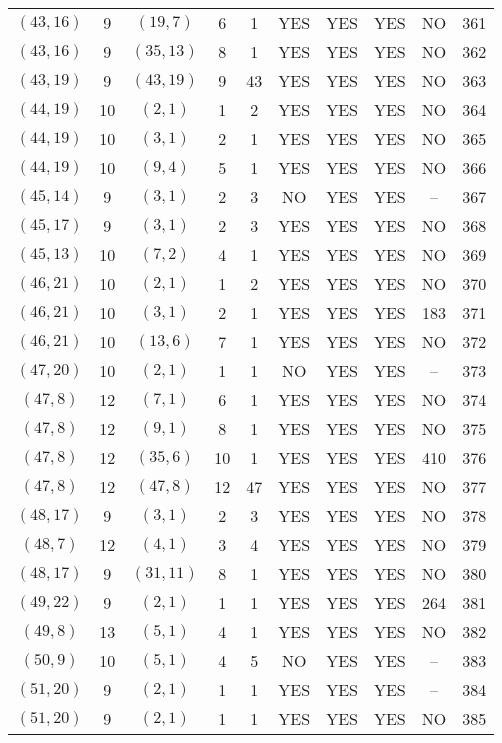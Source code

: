\begin{longtable}{|c|c|c|c|c|c|c|c|c|c|}
$(43, 16)$ & 9 & $(19, 7)$ & 6 & 1 & YES & YES & YES & NO & 361\\
$(43, 16)$ & 9 & $(35, 13)$ & 8 & 1 & YES & YES & YES & NO & 362\\
$(43, 19)$ & 9 & $(43, 19)$ & 9 & 43 & YES & YES & YES & NO & 363\\
$(44, 19)$ & 10 & $(2, 1)$ & 1 & 2 & YES & YES & YES & NO & 364\\
$(44, 19)$ & 10 & $(3, 1)$ & 2 & 1 & YES & YES & YES & NO & 365\\
$(44, 19)$ & 10 & $(9, 4)$ & 5 & 1 & YES & YES & YES & NO & 366\\
$(45, 14)$ & 9 & $(3, 1)$ & 2 & 3 & NO & YES & YES & -- & 367\\
$(45, 17)$ & 9 & $(3, 1)$ & 2 & 3 & YES & YES & YES & NO & 368\\
$(45, 13)$ & 10 & $(7, 2)$ & 4 & 1 & YES & YES & YES & NO & 369\\
$(46, 21)$ & 10 & $(2, 1)$ & 1 & 2 & YES & YES & YES & NO & 370\\
$(46, 21)$ & 10 & $(3, 1)$ & 2 & 1 & YES & YES & YES & 183 & 371\\
$(46, 21)$ & 10 & $(13, 6)$ & 7 & 1 & YES & YES & YES & NO & 372\\
$(47, 20)$ & 10 & $(2, 1)$ & 1 & 1 & NO & YES & YES & -- & 373\\
$(47, 8)$ & 12 & $(7, 1)$ & 6 & 1 & YES & YES & YES & NO & 374\\
$(47, 8)$ & 12 & $(9, 1)$ & 8 & 1 & YES & YES & YES & NO & 375\\
$(47, 8)$ & 12 & $(35, 6)$ & 10 & 1 & YES & YES & YES & 410 & 376\\
$(47, 8)$ & 12 & $(47, 8)$ & 12 & 47 & YES & YES & YES & NO & 377\\
$(48, 17)$ & 9 & $(3, 1)$ & 2 & 3 & YES & YES & YES & NO & 378\\
$(48, 7)$ & 12 & $(4, 1)$ & 3 & 4 & YES & YES & YES & NO & 379\\
$(48, 17)$ & 9 & $(31, 11)$ & 8 & 1 & YES & YES & YES & NO & 380\\
$(49, 22)$ & 9 & $(2, 1)$ & 1 & 1 & YES & YES & YES & 264 & 381\\
$(49, 8)$ & 13 & $(5, 1)$ & 4 & 1 & YES & YES & YES & NO & 382\\
$(50, 9)$ & 10 & $(5, 1)$ & 4 & 5 & NO & YES & YES & -- & 383\\
$(51, 20)$ & 9 & $(2, 1)$ & 1 & 1 & YES & YES & YES & -- & 384\\
$(51, 20)$ & 9 & $(2, 1)$ & 1 & 1 & YES & YES & YES & NO & 385\\

\end{longtable}
